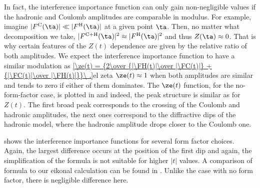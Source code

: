 
In fact, the interference importance function can only gain non-negligible values if the hadronic and Coulomb amplitudes are comparable in modulus. For example, imagine $|\FC(\ta)| \ll |\FH(\ta)|$ at a given point $\ta$. Then, no matter what decomposition  we take, $|\FCH(\ta)|^2 \approx |\FH(\ta)|^2$ and thus $Z(\ta) \approx 0$. That is why certain features of the $Z(t)$ dependence are given by the relative ratio of both amplitudes. We expect the interference importance function to have a similar modulation as 
\eqref{\ze(t) = {2\over {|\FH(t)|\over |\FC(t)|} + {|\FC(t)|\over |\FH(t)|}}\ .}{el zeta}
$\ze(t) \approx 1$ when both amplitudes are similar and tends to zero if either of them dominates. The $\ze(t)$ function, for the no-form-factor case, is plotted in  and indeed, the peak structure is similar as for $Z(t)$. The first broad peak corresponds to the crossing of the Coulomb and hadronic amplitudes, the next ones correspond to the diffractive dips of the hadronic model, where the hadronic amplitude drops closer to the Coulomb one.

 shows the interference importance functions for several form factor choices. Again, the largest difference occurs at the position of the first dip and again, the simplification of the \WaY{} formula is not suitable for higher $|t|$ values. A comparison of \KL{} formula to our eikonal calculation can be found in . Unlike the case with no form factor, there is negligible difference here.




